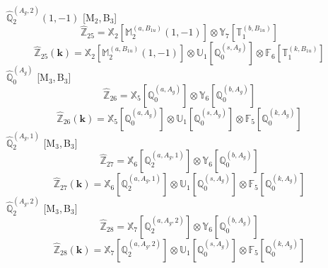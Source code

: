 \documentclass[fleqn,10pt,landscape]{article}
\begin{document}
\begin{itemize}
\vspace{4mm}
\noindent {} $\,\,\,\hat{\mathbb{Q}}_{2}^{(A_{g},2)}(1,-1)$ [M$_{2}$,\,B$_{3}$]
\begin{dmath*}
\hat{\mathbb{Z}}_{25}=\mathbb{X}_{2}[\mathbb{M}_{2}^{(a,B_{1u})}(1,-1)] \otimes\mathbb{Y}_{7}[\mathbb{T}_{1}^{(b,B_{1u})}]
\end{dmath*}
\begin{dmath*}
\hat{\mathbb{Z}}_{25}(\bm{k})=\mathbb{X}_{2}[\mathbb{M}_{2}^{(a,B_{1u})}(1,-1)] \otimes\mathbb{U}_{1}[\mathbb{Q}_{0}^{(s,A_{g})}] \otimes\mathbb{F}_{6}[\mathbb{T}_{1}^{(k,B_{1u})}]
\end{dmath*}
\vspace{4mm}
\noindent {} $\,\,\,\hat{\mathbb{Q}}_{0}^{(A_{g})}$ [M$_{3}$,\,B$_{3}$]
\begin{dmath*}
\hat{\mathbb{Z}}_{26}=\mathbb{X}_{5}[\mathbb{Q}_{0}^{(a,A_{g})}] \otimes\mathbb{Y}_{6}[\mathbb{Q}_{0}^{(b,A_{g})}]
\end{dmath*}
\begin{dmath*}
\hat{\mathbb{Z}}_{26}(\bm{k})=\mathbb{X}_{5}[\mathbb{Q}_{0}^{(a,A_{g})}] \otimes\mathbb{U}_{1}[\mathbb{Q}_{0}^{(s,A_{g})}] \otimes\mathbb{F}_{5}[\mathbb{Q}_{0}^{(k,A_{g})}]
\end{dmath*}
\vspace{4mm}
\noindent {} $\,\,\,\hat{\mathbb{Q}}_{2}^{(A_{g},1)}$ [M$_{3}$,\,B$_{3}$]
\begin{dmath*}
\hat{\mathbb{Z}}_{27}=\mathbb{X}_{6}[\mathbb{Q}_{2}^{(a,A_{g},1)}] \otimes\mathbb{Y}_{6}[\mathbb{Q}_{0}^{(b,A_{g})}]
\end{dmath*}
\begin{dmath*}
\hat{\mathbb{Z}}_{27}(\bm{k})=\mathbb{X}_{6}[\mathbb{Q}_{2}^{(a,A_{g},1)}] \otimes\mathbb{U}_{1}[\mathbb{Q}_{0}^{(s,A_{g})}] \otimes\mathbb{F}_{5}[\mathbb{Q}_{0}^{(k,A_{g})}]
\end{dmath*}
\vspace{4mm}
\noindent {} $\,\,\,\hat{\mathbb{Q}}_{2}^{(A_{g},2)}$ [M$_{3}$,\,B$_{3}$]
\begin{dmath*}
\hat{\mathbb{Z}}_{28}=\mathbb{X}_{7}[\mathbb{Q}_{2}^{(a,A_{g},2)}] \otimes\mathbb{Y}_{6}[\mathbb{Q}_{0}^{(b,A_{g})}]
\end{dmath*}
\begin{dmath*}
\hat{\mathbb{Z}}_{28}(\bm{k})=\mathbb{X}_{7}[\mathbb{Q}_{2}^{(a,A_{g},2)}] \otimes\mathbb{U}_{1}[\mathbb{Q}_{0}^{(s,A_{g})}] \otimes\mathbb{F}_{5}[\mathbb{Q}_{0}^{(k,A_{g})}]
\end{dmath*}

\end{itemize}
\end{document}
